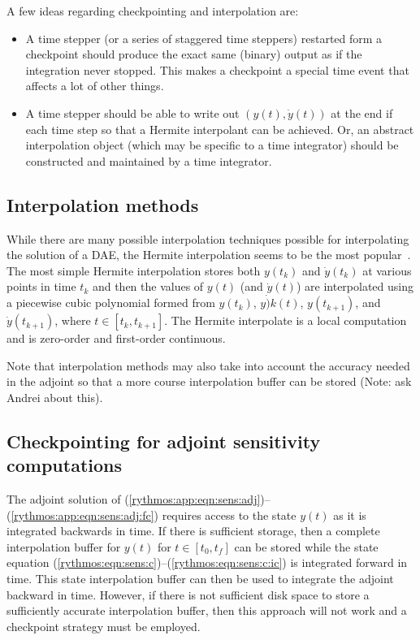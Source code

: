 \documentclass[pdf,ps2pdf,11pt]{SANDreport}
\begin{document}
A few ideas regarding checkpointing and interpolation are:
\begin{itemize}
%
{}\item A time stepper (or a series of staggered time steppers) restarted form
a checkpoint should produce the exact same (binary) output as if the
integration never stopped.  This makes a checkpoint a special time event that
affects a lot of other things.
%
{}\item A time stepper should be able to write out $(y(t),\dot{y}(t))$ at the
end if each time step so that a Hermite interpolant can be achieved.  Or, an
abstract interpolation object (which may be specific to a time integrator)
should be constructed and maintained by a time integrator.
%
\end{itemize}

\subsection{Interpolation methods}

While there are many possible interpolation techniques possible for
interpolating the solution of a DAE, the Hermite interpolation seems to be the
most popular~\cite{sundials}.  The most simple Hermite interpolation stores
both $y(t_k)$ and $\dot{y}(t_k)$ at various points in time $t_k$ and then the
values of $y(t)$ (and $\dot{y}(t)$) are interpolated using a piecewise cubic
polynomial formed from $y(t_k)$, $\dot{y)k}(t)$, $y(t_{k+1})$, and
$\dot{y}(t_{k+1})$, where $t\in[t_k,t_{k+1}]$.  The Hermite interpolate is a
local computation and is zero-order and first-order continuous.

Note that interpolation methods may also take into account the accuracy needed
in the adjoint so that a more course interpolation buffer can be stored (Note:
ask Andrei about this).

\subsection{Checkpointing for adjoint sensitivity computations}

The adjoint solution of
(\ref{rythmos:app:eqn:sens:adj})--(\ref{rythmos:app:eqn:sens:adj:fc}) requires
access to the state $y(t)$ as it is integrated backwards in time.  If there is
sufficient storage, then a complete interpolation buffer for $y(t)$ for
$t\in[t_0,t_f]$ can be stored while the state equation
(\ref{rythmos:eqn:sens:c})--(\ref{rythmos:eqn:sens:c:ic}) is integrated
forward in time.  This state interpolation buffer can then be used to
integrate the adjoint backward in time.  However, if there is not sufficient
disk space to store a sufficiently accurate interpolation buffer, then this
approach will not work and a checkpoint strategy must be employed.
\end{document}
